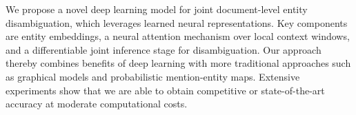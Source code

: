 We propose a novel deep learning model for joint document-level entity disambiguation, which leverages learned neural representations. Key components are entity embeddings, a neural attention mechanism over local context windows, and a differentiable joint inference stage for disambiguation. Our approach thereby combines benefits of deep learning with more traditional approaches such as graphical models and probabilistic mention-entity maps. Extensive experiments show that we are able to obtain competitive or state-of-the-art accuracy at moderate computational costs.
